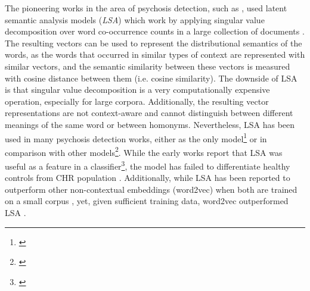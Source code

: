 The pioneering works in the area of psychosis detection, such as \citet{elvevaag2007quantifying, elvevaag2010automated}, used latent semantic analysis models (\textit{LSA}) which work by applying singular value decomposition over word co-occurrence counts in a large collection of documents \citep{landauer1998introduction}. The resulting vectors can be used to represent the distributional semantics of the words, as the words that occurred in similar types of context are represented with similar vectors, and the semantic similarity between these vectors is measured with cosine distance between them (i.e. cosine similarity). The downside of LSA is that singular value decomposition is a very computationally expensive operation, especially for large corpora. Additionally, the resulting vector representations are not context-aware and cannot distinguish between different meanings of the same word or between homonyms. Nevertheless, LSA has been used in many psychosis detection works, either as the only model\footnote{\cite{elvevaag2007quantifying, elvevaag2010automated, rosenstein2015language, bedi2015automated, haas2020linking}} or in comparison with other models\footnote{\cite{iter2018automatic, xu2020centroid, hitczenko2021understanding, tang2021natural, tang2023latent}}. While the early works report that LSA was useful as a feature in a classifier\footnote{\cite{elvevaag2007quantifying, elvevaag2010automated, rosenstein2015language, bedi2015automated}}, the model has failed to differentiate healthy controls from CHR population \citep{hitczenko2021understanding, haas2020linking}. Additionally, while LSA has been reported to outperform other non-contextual embeddings (word2vec) when both are trained on a small corpus \citep{xu2020centroid}, yet, given sufficient training data, word2vec outperformed LSA  \citep{iter2018automatic, xu2020centroid}.

